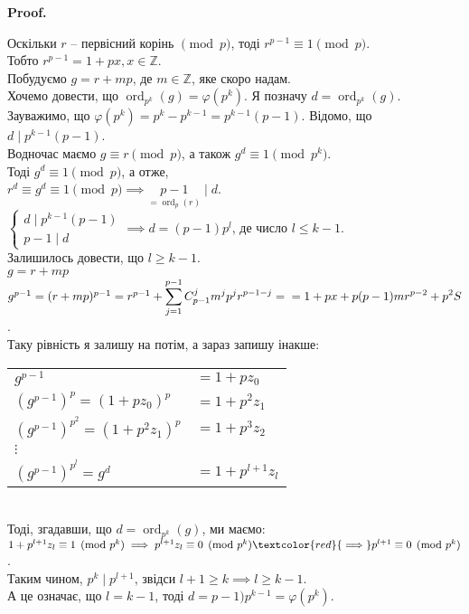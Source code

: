 \documentclass[a4paper, 14pt]{extarticle}
\makeatletter
\theoremstyle{theoremdd}
\theoremstyle{theoremdd}
\theoremstyle{theoremdd}
\theoremstyle{theoremdd}
\theoremstyle{theoremdd}
\theoremstyle{theoremdd}
\theoremstyle{theoremdd}
\theoremstyle{theoremdd}
\def\qed{$\blacksquare$}
\renewenvironment{proof}[1][Proof.\\]{\par
\pushQED{\hfill \qed}%
\normalfont \topsep6\p@\@plus6\p@\relax
\trivlist
\item\relax
{\bfseries
#1\@addpunct{.}}\hspace\labelsep\ignorespaces
}{%
\popQED\endtrivlist\@endpefalse
}
\DeclareMathOperator{\ord}{ord}
\makeatother
\begin{document}
\begin{proof}
Оскільки $r$ -- первісний корінь $\pmod p$, тоді $r^{p-1} \equiv 1 \pmod p$.\\
Тобто $r^{p-1} = 1 + px, x \in \mathbb{Z}$.\\
Побудуємо $g = r+mp$, де $m \in \mathbb{Z}$, яке скоро надам.\\
Хочемо довести, що $\ord_{p^k} (g) = \varphi(p^k)$. Я позначу $d =\ord_{p^k} (g)$.\\
Зауважимо, що $\varphi(p^k) = p^k - p^{k-1} = p^{k-1}(p-1)$.
Відомо, що $d \mid p^{k-1} (p-1)$.\\
Водночас маємо $g \equiv r \pmod p$, а також $g^d \equiv 1 \pmod {p^k}$.\\
Тоді $g^d \equiv 1 \pmod p$, а отже,\\
$r^d \equiv g^d \equiv 1 \pmod p \implies \underset{=\ord_p(r)}{p-1} \mid d$.\\
$\begin{cases} d \mid p^{k-1}(p-1) \\ p-1 \mid d \end{cases} \implies d = (p-1)p^l$, де число $l \leq k-1$.\\
Залишилось довести, що $l \geq k-1$.
\bigskip \\
$g = r + mp$\\
$g^{p-1} = (r+mp)^{p-1} = r^{p-1} + \displaystyle\sum_{j=1}^{p-1} C_{p-1}^j m^j p^j r^{p-1-j} = \\ = 1+px + p(p-1)mr^{p-2} + p^2S$.\\
Таку рівність я залишу на потім, а зараз запишу інакше:\\
\begin{tabular}{ll}
$g^{p-1}$ & $= 1 + pz_0$\\
$(g^{p-1})^p = (1+pz_0)^p$ & $= 1 + p^2z_1$\\
$(g^{p-1})^{p^2} = (1+p^2z_1)^p$ & $= 1 + p^3z_2$\\
$\vdots$ & \\
$(g^{p-1})^{p^l} = g^d$ & $= 1+p^{l+1}z_l$
\end{tabular}\\
Тоді, згадавши, що $d = \ord_{p^k} (g)$, ми маємо:\\
$1 + p^{l+1}z_l \equiv 1 \pmod {p^k} \implies p^{l+1}z_l \equiv 0 \pmod {p^k} \textcolor{red}{\implies} p^{l+1} \equiv 0 \pmod {p^k}$.\\
Таким чином, $p^k \mid p^{l+1}$, звідси $l+1 \geq k \implies l \geq k-1$.\\
А це означає, що $l=k-1$, тоді $d = p-1)p^{k-1} = \varphi(p^k)$.\\

\end{proof}
\end{document}
